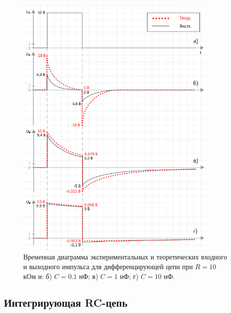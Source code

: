 \documentclass[a4paper,14pt]{extarticle}
\begin{document}
\begin{figure}[H]
\begin{center}
	\includegraphics[width=0.89\textwidth]{diff_with_theory}
	\captionsetup{justification=centering}
	\caption{Временная диаграмма экспериментальных и теоретических входного и выходного импульса для дифференцирующей цепи при $R = 10$ кОм и: б) $C = 0.1$ нФ; в) $C = 1$ нФ; г) $C = 10$ нФ.} 
	\label{fig:diff}
\end{center}
\end{figure}

\subsection{Интегрирующая RC-цепь}
\end{document}
